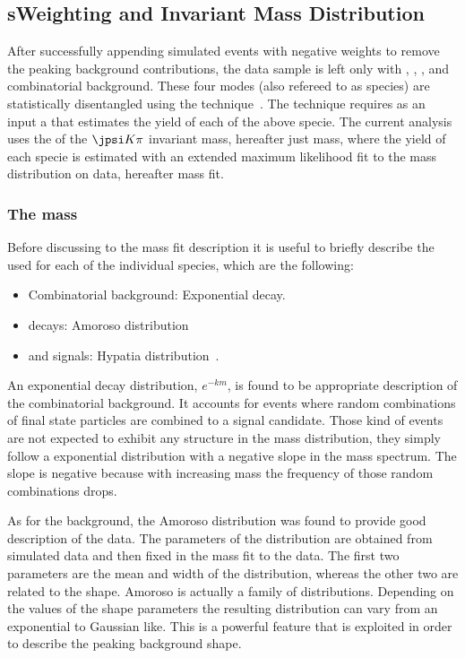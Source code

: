 \subsection{sWeighting and Invariant Mass Distribution}
\label{sWeighting_and_mass}

After successfully appending simulated events with negative weights to remove the peaking background contributions, the data sample is left only with
\BdJpsiKpi, \BsJpsiKpi, \LbJpsippi, and combinatorial background. These four modes (also refereed to as species) are statistically
disentangled using the \sPlot technique~\cite{splot}. The technique requires as an input a \pdf that estimates the yield of each
of the above specie. The current analysis uses the \pdf of the $\jpsi K\pi$ invariant mass, hereafter just mass, where the yield of each specie
is estimated with an extended maximum likelihood fit to the mass distribution on data, hereafter mass fit.

\subsubsection{The mass \pdf}
Before discussing to the mass fit description it is useful to briefly describe the \pdfs used for each of the individual species, which are the following:

\begin{itemize}
\item Combinatorial background: Exponential decay.
\item \LbJpsippi decays: Amoroso distribution~\cite{Amoroso}
\item \Bd and \Bs signals: Hypatia distribution~\cite{Santos:2013gra}.
\end{itemize}

\noindent An exponential decay distribution, $e^{-km}$, is found to be appropriate description of the combinatorial background. It  accounts
for events where random combinations of final state particles are combined to a signal candidate. Those kind of events are not expected to
exhibit any structure in the mass distribution, they simply follow a exponential distribution with a negative slope in the mass spectrum. The slope is
negative because with increasing mass the frequency of those random combinations drops.

As for the \LbJpsippi background, the Amoroso distribution was found to provide good description of the data.
The parameters of the distribution are obtained from simulated data and then fixed in the mass fit to the data. The first two parameters
are the mean and width of the distribution, whereas the other two are related to the shape. Amoroso is actually a family of distributions.
Depending on the values of the shape parameters the resulting distribution can vary from an exponential to Gaussian like. This is a powerful
feature that is exploited in order to describe the \LbJpsippi peaking background shape.

